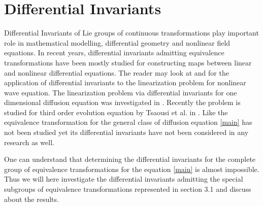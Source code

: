 \documentclass[a4paper]{article}
\begin{document}
  \section{Differential Invariants}
Differential Invariants of Lie groups of continuous transformations
play important role in mathematical modelling, differential geometry
and nonlinear field equations. In recent years, differential
invariants admitting equivalence transformations have been mostly
studied for constructing  maps between linear and nonlinear
differential equations. The reader may look at \cite{tracina2004invariants} and
\cite{torrisi2004linearization} for the application of differential invariants to the
linearization problem for nonlinear wave equation.  The
linearization problem via differential invariants for one
dimensional diffusion equation was investigated in \cite{torrisi2005second,gandarias2007some,
ibragimov2007differential,torrisi2011exact}. Recently the problem is
studied for third order evolution equation by Tsaousi et al. in
\cite{tsaousi2015differential}. Like the equivalence transformation for the general class of diffusion equation \eqref{main} has not been studied yet its differential invariants have  not been considered in any research as well. \par
 One can understand that determining the differential invariants for the complete group of equivalence transformations for the  equation \eqref{main} is almost impossible. Thus  we will here investigate the
differential invariants  admitting the special
subgroups of equivalence transformations represented in section 3.1 and discuss about the results.
\end{document}

